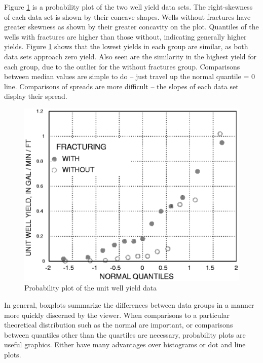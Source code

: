 \documentclass[]{book}
\begin{document}
Figure \ref{fig:fig-2-22} is a probability plot of the two well yield data sets. The right-skewness of each data set is shown by their concave shapes. Wells without fractures have greater skewness as shown by their greater concavity on the plot. Quantiles of the wells with fractures are higher than those without, indicating generally higher yields. Figure \ref{fig:fig-2-22} shows that the lowest yields in each group are similar, as both data sets approach zero yield. Also seen are the similarity in the highest yield for each group, due to the outlier for the without fractures group. Comparisons between median values are simple to do -- just travel up the normal quantile = 0 line. Comparisons of spreads are more difficult -- the slopes of each data set display their spread.

\begin{figure}

{\centering \includegraphics[width=12.82in]{figures/2_22} 

}

\caption{Probability plot of the unit well yield data}\label{fig:fig-2-22}
\end{figure}

In general, boxplots summarize the differences between data groups in a manner more quickly discerned by the viewer. When comparisons to a particular theoretical distribution such as the normal are important, or comparisons between quantiles other than the quartiles are necessary, probability plots are useful graphics. Either have many advantages over histograms or dot and line plots.
\end{document}
